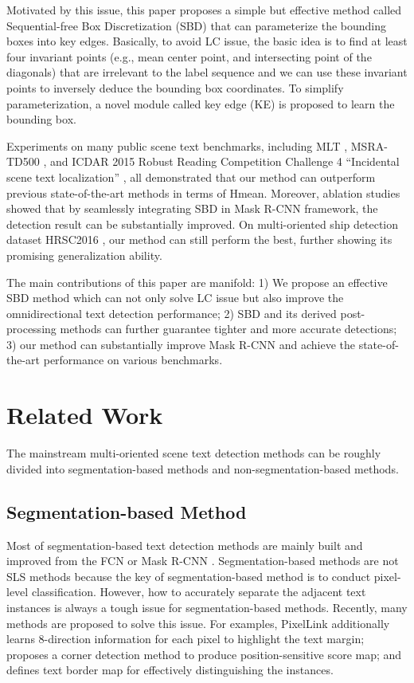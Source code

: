 \documentclass{article}
\begin{document}
Motivated by this issue, this paper proposes a simple but effective method called Sequential-free Box Discretization (SBD) that can parameterize the bounding boxes into key edges. Basically, to avoid LC issue, the basic idea is to find at least four invariant points (e.g., mean center point, and intersecting point of the diagonals) that are irrelevant to the label sequence and we can use these invariant points to inversely deduce the bounding box coordinates. To simplify parameterization, a novel module called key edge (KE) is proposed to learn the bounding box.

Experiments on many public scene text benchmarks, including MLT \cite{nayef2017icdar2017}, MSRA-TD500 \cite{Yao2012Detecting}, and ICDAR 2015 Robust Reading Competition Challenge 4 ``Incidental scene text localization'' \cite{karatzas2015icdar}, all demonstrated that our method can outperform previous state-of-the-art methods in terms of Hmean. Moreover, ablation studies showed that by seamlessly integrating SBD in Mask R-CNN framework, the detection result can be substantially improved.
On multi-oriented ship detection dataset HRSC2016 \cite{liu2017rotated}, our method can still perform the best, further showing its promising generalization ability.

The main contributions of this paper are manifold: 1) We propose an effective SBD method which can not only solve LC issue but also improve the omnidirectional text detection performance; 2) SBD and its derived post-processing methods can further guarantee tighter and more accurate detections; 3) our method can substantially improve Mask R-CNN and achieve the state-of-the-art performance on various benchmarks.

\section{Related Work}
The mainstream multi-oriented scene text detection methods can be roughly divided into segmentation-based methods and non-segmentation-based methods.

\subsection{Segmentation-based Method}

Most of segmentation-based text detection methods are mainly built and improved from the FCN \cite{long2015fully} or Mask R-CNN \cite{he2017mask}. Segmentation-based methods are not SLS methods because the key of segmentation-based method is to conduct pixel-level classification. However, how to accurately separate the adjacent text instances is always a tough issue for segmentation-based methods. Recently, many methods are proposed to solve this issue. For examples, PixelLink \cite{deng2018pixellink} additionally learns 8-direction information for each pixel to highlight the text margin; \cite{lyu2018multi} proposes a corner detection method to produce position-sensitive score map; and \cite{wu2017self} defines text border map for effectively distinguishing the instances. 
\end{document}

